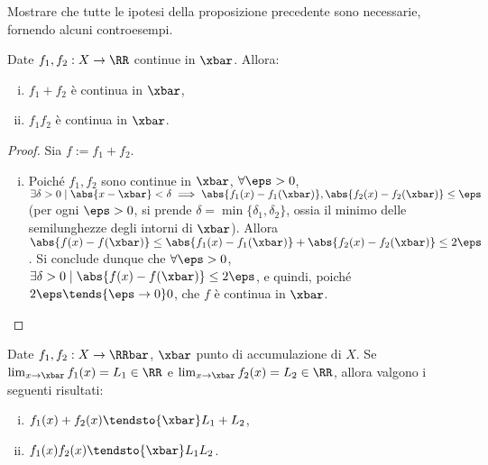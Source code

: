 \documentclass[11pt]{article}
\begin{document}
	\begin{exercise}
		Mostrare che tutte le ipotesi della proposizione precedente sono necessarie, fornendo alcuni controesempi.
	\end{exercise}

	\begin{proposition}
		Date $f_1, f_2 : X \to \RR$ continue in $\xbar$. Allora:
		
		\begin{enumerate}[(i)]
			\item $f_1 + f_2$ è continua in $\xbar$,
			\item $f_1 f_2$ è continua in $\xbar$.
		\end{enumerate}
	\end{proposition}

	\begin{proof}
		Sia $f := f_1 + f_2$.
		
		\begin{enumerate}[(i)]
			\item Poiché $f_1, f_2$ sono continue in $\xbar$,
			$\forall \eps > 0$, $\exists \delta > 0 \mid \abs{x - \xbar} < \delta
			\implies \abs{f_1(x) - f_1(\xbar)}, \abs{f_2(x) - f_2(\xbar)} \leq \eps$ (per ogni $\eps > 0$, si prende $\delta = \min\{\delta_1, \delta_2\}$, ossia il minimo delle semilunghezze degli intorni
			di $\xbar$). Allora $\abs{f(x) - f(\xbar)} \leq
			\abs{f_1(x) - f_1(\xbar)} + \abs{f_2(x) - f_2(\xbar)} \leq 2\eps$.
			Si conclude dunque che $\forall \eps > 0$, $\exists \delta > 0
			\mid \abs{f(x) - f(\xbar)} \leq 2\eps$, e quindi, poiché
			$2\eps \tends{\eps \to 0} 0$, che $f$ è continua in $\xbar$.
		\end{enumerate}
	\end{proof}

	\begin{proposition}
		Date $f_1, f_2 : X \to \RRbar$, $\xbar$ punto di accumulazione
		di $X$. Se $\lim_{x \to \xbar} f_1(x) = L_1 \in \RR$ e
		$\lim_{x \to \xbar} f_2(x) = L_2 \in \RR$, allora valgono
		i seguenti risultati:
		
		\begin{enumerate}[(i)]
			\item $f_1(x) + f_2(x) \tendsto{\xbar} L_1 + L_2$,
			\item $f_1(x) f_2(x) \tendsto{\xbar} L_1 L_2$.
		\end{enumerate}
	\end{proposition}
\end{document}
